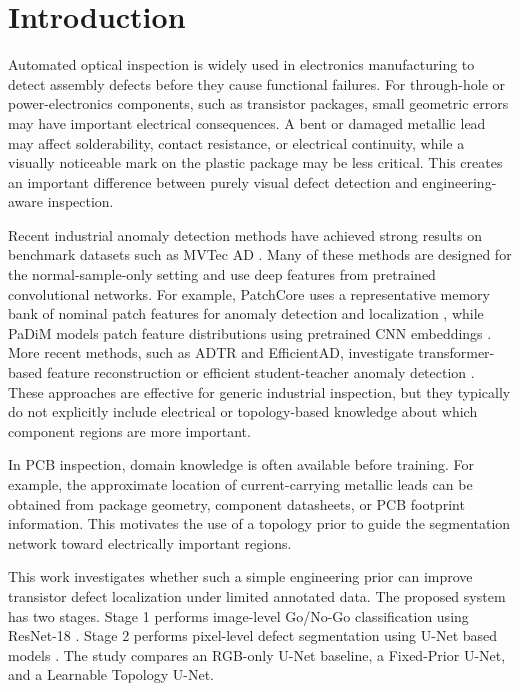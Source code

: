 \documentclass[conference,a4paper]{IEEEtran}
\begin{document}
\section{Introduction}

Automated optical inspection is widely used in electronics manufacturing to detect assembly defects before they cause functional failures. For through-hole or power-electronics components, such as transistor packages, small geometric errors may have important electrical consequences. A bent or damaged metallic lead may affect solderability, contact resistance, or electrical continuity, while a visually noticeable mark on the plastic package may be less critical. This creates an important difference between purely visual defect detection and engineering-aware inspection.

Recent industrial anomaly detection methods have achieved strong results on benchmark datasets such as MVTec AD \cite{bergmann2019mvtec,bergmann2021mvtec}. Many of these methods are designed for the normal-sample-only setting and use deep features from pretrained convolutional networks. For example, PatchCore uses a representative memory bank of nominal patch features for anomaly detection and localization \cite{roth2022patchcore}, while PaDiM models patch feature distributions using pretrained CNN embeddings \cite{defard2021padim}. More recent methods, such as ADTR and EfficientAD, investigate transformer-based feature reconstruction or efficient student-teacher anomaly detection \cite{you2022adtr,batzner2024efficientad}. These approaches are effective for generic industrial inspection, but they typically do not explicitly include electrical or topology-based knowledge about which component regions are more important.

In PCB inspection, domain knowledge is often available before training. For example, the approximate location of current-carrying metallic leads can be obtained from package geometry, component datasheets, or PCB footprint information. This motivates the use of a topology prior to guide the segmentation network toward electrically important regions.

This work investigates whether such a simple engineering prior can improve transistor defect localization under limited annotated data. The proposed system has two stages. Stage 1 performs image-level Go/No-Go classification using ResNet-18 \cite{he2016resnet}. Stage 2 performs pixel-level defect segmentation using U-Net based models \cite{ronneberger2015unet}. The study compares an RGB-only U-Net baseline, a Fixed-Prior U-Net, and a Learnable Topology U-Net.
\end{document}
